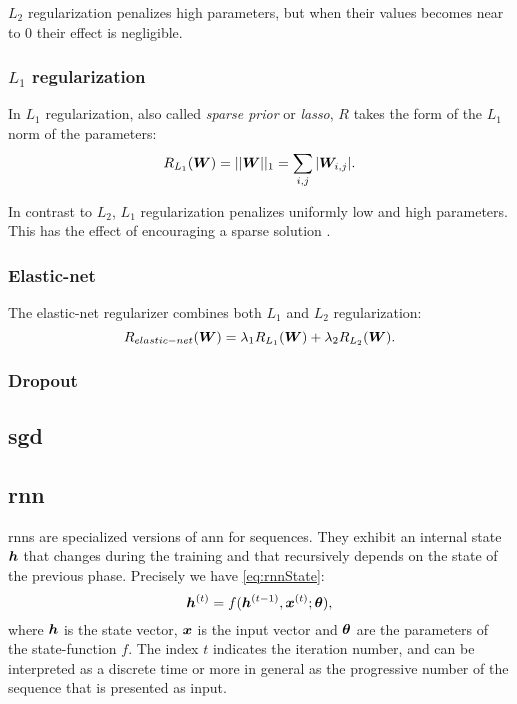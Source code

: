 $L_2$ regularization penalizes high parameters, but when their values
becomes near to $0$ their effect is negligible.

\subsubsection{$L_1$ regularization}
In $L_1$ regularization, also called \emph{sparse prior} or
\emph{lasso}, $R$ takes the form of the $L_1$ norm of the parameters:
\begin{equation*}
  R_{L_1}(\bm{W})=||\bm{W}||_1=\sum_{i,j}|\bm{W}_{i,j}|.
\end{equation*}

In contrast to $L_2$, $L_1$ regularization penalizes uniformly low and
high parameters. This has the effect of encouraging a sparse solution
\cite{tibshirani1996regression}.

\subsubsection{Elastic-net}
The elastic-net regularizer \cite{zou2005regularization} combines both
$L_1$ and $L_2$ regularization:
\begin{equation*}
  R_{elastic-net}(\bm{W})=\lambda_1R_{L_1}(\bm{W})+\lambda_2R_{L_2}(\bm{W}).
\end{equation*}

\subsubsection{Dropout}

\subsection{\acf{sgd}}

\subsection{\acf{rnn}}
\acp{rnn} are specialized versions of \ac{ann} for sequences. They
exhibit an
internal state $\bm{h}$ that changes during the training and that
recursively depends on the state of the previous phase. Precisely we
have \cref{eq:rnnState}:
\begin{equation}\label{eq:rnnState}
  \bm{h}^{(t)} = f(\bm{h}^{(t-1)}, \bm{x}^{(t)}; \bm{\theta}),
\end{equation}
where $\bm{h}$ is the state vector, $\bm{x}$ is the input vector
and $\bm{\theta}$ are the parameters of the state-function
$f$. The index $t$ indicates 
the iteration number, and can be interpreted as a discrete time or
more in general as the progressive number of the sequence that is
presented as
input.

